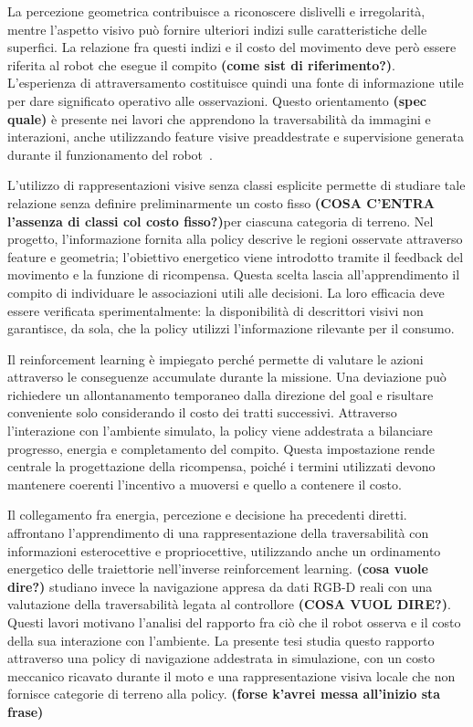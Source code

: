 La percezione geometrica contribuisce a riconoscere dislivelli e irregolarità, mentre l'aspetto visivo può fornire ulteriori indizi sulle caratteristiche delle superfici. La relazione fra questi indizi e il costo del movimento deve però essere riferita al robot che esegue il compito \textbf{(come sist di riferimento?)}. L'esperienza di attraversamento costituisce quindi una fonte di informazione utile per dare significato operativo alle osservazioni. Questo orientamento \textbf{(spec quale)} è presente nei lavori che apprendono la traversabilità da immagini e interazioni, anche utilizzando feature visive preaddestrate e supervisione generata durante il funzionamento del robot~\citep{Mattamala2025Wild}.

L'utilizzo di rappresentazioni visive senza classi esplicite permette di studiare tale relazione senza definire preliminarmente un costo fisso \textbf{(COSA C'ENTRA l'assenza di classi col costo fisso?)}per ciascuna categoria di terreno. Nel progetto, l'informazione fornita alla policy descrive le regioni osservate attraverso feature e geometria; l'obiettivo energetico viene introdotto tramite il feedback del movimento e la funzione di ricompensa. Questa scelta lascia all'apprendimento il compito di individuare le associazioni utili alle decisioni. La loro efficacia deve essere verificata sperimentalmente: la disponibilità di descrittori visivi non garantisce, da sola, che la policy utilizzi l'informazione rilevante per il consumo.

Il reinforcement learning è impiegato perché permette di valutare le azioni attraverso le conseguenze accumulate durante la missione. Una deviazione può richiedere un allontanamento temporaneo dalla direzione del goal e risultare conveniente solo considerando il costo dei tratti successivi. Attraverso l'interazione con l'ambiente simulato, la policy viene addestrata a bilanciare progresso, energia e completamento del compito. Questa impostazione rende centrale la progettazione della ricompensa, poiché i termini utilizzati devono mantenere coerenti l'incentivo a muoversi e quello a contenere il costo.

Il collegamento fra energia, percezione e decisione ha precedenti diretti. \citet{Gan2022Energy} affrontano l'apprendimento di una rappresentazione della traversabilità con informazioni esterocettive e propriocettive, utilizzando anche un ordinamento energetico delle traiettorie nell'inverse reinforcement learning. \textbf{(cosa vuole dire?) } \citet{Zhang2026Traversability} studiano invece la navigazione appresa da dati RGB-D reali con una valutazione della traversabilità legata al controllore\textbf{ (COSA VUOL DIRE?)}. Questi lavori motivano l'analisi del rapporto fra ciò che il robot osserva e il costo della sua interazione con l'ambiente. La presente tesi studia questo rapporto attraverso una policy di navigazione addestrata in simulazione, con un costo meccanico ricavato durante il moto e una rappresentazione visiva locale che non fornisce categorie di terreno alla policy. \textbf{(forse k'avrei messa all'inizio sta frase)}

